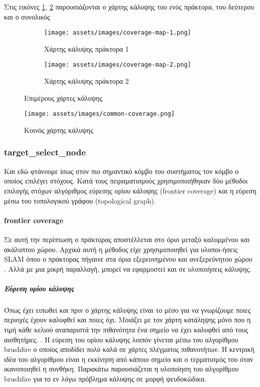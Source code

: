 Στις εικόνες \ref{fig:seperate coverage maps}, \ref{fig:common-coverage-maps} παρουσιάζονται ο χάρτης κάλυψης του ενός πράκτορα, του δεύτερου και ο συνολικός 

\begin{figure}[!h]
	\centering
	\begin{subfigure}{0.49\textwidth}
		\texttt{[image: assets/images/coverage-map-1.png]}
		\caption{Χάρτης κάλυψης πράκτορα 1}
	\end{subfigure}%
	\begin{subfigure}{0.49\textwidth}
		\texttt{[image: assets/images/coverage-map-2.png]}
		\caption{Χάρτης κάλυψης πράκτορα 2}
	\end{subfigure}
	\caption{Επιμέρους χάρτες κάλυψης}
	\label{fig:seperate coverage maps}
\end{figure}

\begin{figure}[!h]
	\centering
	\texttt{[image: assets/images/common-coverage.png]}
	\caption{Κοινός χάρτης κάλυψης}
	\label{fig:common-coverage-maps}
\end{figure}

\newpage

\subsubsection{target\_select\_node} Και εδώ φτάνουμε ίσως στον πιο σημαντικό κόμβο του συστήματος τον κόμβο ο οποίος επιλέγει στόχους. Κατά τους πειραματισμούς χρησιμοποιήθηκαν δύο μέθοδοι επιλογής στόχων αλγόριθμος εύρεσης ορίου κάλυψης (frontier coverage) και η εύρεση μέσω του τοπολογικού γράφου (topological graph).

\paragraph{frontier coverage} Σε αυτή την περίπτωση ο πράκτορας αποστέλλεται στο όριο μεταξύ καλυμμένου και ακάλυπτου χώρου. Αρχικά αυτή η μέθοδος είχε χρησιμοποιηθεί για υλοποι-ήσεις SLAM όπου ο πράκτορας πήγαινε στα όρια εξερευνημένου και ανεξερεύνητου χώρου \cite{Yamauchi}. Αλλά με μια μικρή παραλλαγή, μπορεί να εφαρμοστεί και σε υλοποιήσεις κάλυψης. 

\subparagraph{Εύρεση ορίου κάλυψης} Όπως έχει ειπωθεί και πριν ο χάρτης κάλυψης είναι το μέσο για να γνωρίζουμε ποιες περιοχές έχουν καλυφθεί και ποιες όχι. Μοιάζει με τον χάρτη κατάληψης μόνο που η τιμή κάθε κελιού αναπαριστά την πιθανότητα ένα σημείο να έχει καλυφθεί από τους αισθητήρες. \cite{2013}. Η εύρεση του ορίου κάλυψης λοιπόν γίνεται μέσω του αλγορίθμου brushfire ο οποίος αποδίδει πολύ καλά σε χάρτες πλέγματος πιθανοτήτων.
Η κεντρική ιδέα του αλγορίθμου είναι η εκκίνηση από κάποιο σημείο και ο τερματισμός του όταν ικανοποιηθεί η συνθήκη. Παρακάτω παρουσιάζεται η υλοποίηση του αλγορίθμου brushfire για το εν λόγω πρόβλημα κάλυψης σε μορφή ψευδοκώδικα.


